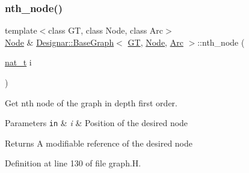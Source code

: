 \subsubsection{\texorpdfstring{nth\+\_\+node()}{nth\_node()}\hspace{0.1cm}{\footnotesize\ttfamily [1/2]}}
{\footnotesize\ttfamily template$<$class GT, class Node, class Arc$>$ \\
\hyperlink{namespace_designar_a5af326c65aa2bd26b26c410f2030d09e}{Node} \& \hyperlink{class_designar_1_1_base_graph}{Designar\+::\+Base\+Graph}$<$ \hyperlink{demo-buildgraph_8_c_a3001c40d2c31ca87ed96cd7d1334a55e}{GT}, \hyperlink{namespace_designar_a5af326c65aa2bd26b26c410f2030d09e}{Node}, \hyperlink{namespace_designar_a3f55fb5513d62ff47cbc8f72b8e95d6f}{Arc} $>$\+::nth\+\_\+node (\begin{DoxyParamCaption}\item[{\hyperlink{namespace_designar_aa72662848b9f4815e7bf31a7cf3e33d1}{nat\+\_\+t}}]{i }\end{DoxyParamCaption})\hspace{0.3cm}{\ttfamily [inline]}}



Get nth node of the graph in depth first order. 


\begin{DoxyParams}[1]{Parameters}
\mbox{\tt in}  & {\em i} & Position of the desired node \\
\hline
\end{DoxyParams}
\begin{DoxyReturn}{Returns}
A modifiable reference of the desired node 
\end{DoxyReturn}


Definition at line 130 of file graph.\+H.

\mbox{\label{class_designar_1_1_base_graph_adc03e916cb6246c9eeba181df82fd149}} 
